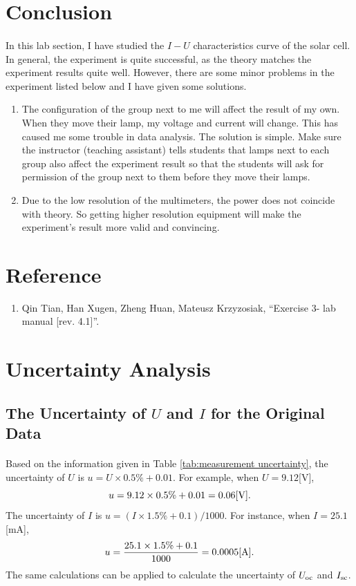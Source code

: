\documentclass[a4paper]{article}
\begin{document}
    \section{Conclusion}
    \paragraph{} In this lab section, I have studied the $I-U$ characteristics curve of the solar cell. In general, the experiment is quite successful, as the theory matches the experiment results quite well. However, there are some minor problems in the experiment listed below and I have given some solutions. 
    \begin{enumerate}
        \item The configuration of the group next to me will affect the result of my own. When they move their lamp, my voltage and current will change. This has caused me some trouble in data analysis. The solution is simple. Make sure the instructor (teaching assistant) tells students that lamps next to each group also affect the experiment result so that the students will ask for permission of the group next to them before they move their lamps. 
        \item Due to the low resolution of the multimeters, the power does not coincide with theory. So getting higher resolution equipment will make the experiment's result more valid and convincing.  
    \end{enumerate}    
    \section{Reference}
    \begin{enumerate}
        \item Qin Tian, Han Xugen, Zheng Huan, Mateusz Krzyzosiak, ``Exercise 3- lab manual [rev. 4.1]''.
    \end{enumerate}
    \renewcommand\thesection{\Alph{section}} 
    \setcounter{section}{0}
    \newpage
    \section{Uncertainty Analysis}
    \subsection{The Uncertainty of $U$ and $I$ for the Original Data}
    \paragraph{} Based on the information given in Table \ref{tab:measurement uncertainty}, the uncertainty of $U$ is $u=U\times 0.5\%+0.01$. For example, when $U=9.12$[V], $$u=9.12\times 0.5\%+0.01=0.06[\rm V].$$
    The uncertainty of $I$ is $u=(I\times 1.5\%+0.1)/1000$. For instance, when $I=25.1$[mA], $$u=\frac{25.1\times 1.5\%+0.1}{1000}=0.0005[\rm A].$$
    The same calculations can be applied to calculate the uncertainty of $U_{\rm oc}$ and $I_{\rm sc}$.
\end{document}
